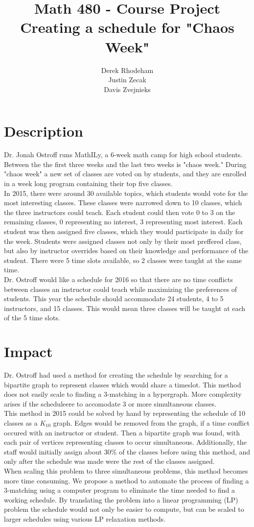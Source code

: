 \documentclass[11pt]{article}
\title{\textbf{Math 480 - Course Project}
			  \\Creating a schedule for "Chaos Week"}
\author{Derek Rhodeham\\
		Justin Zecak\\
		Davis Zvejnieks}
\date{}
\begin{document}
\maketitle

\section{Description}
Dr. Jonah Ostroff runs MathILy, a 6-week math camp for high school students. Between the the first three weeks and the last two weeks is "chaos week." During "chaos week" a new set of classes are voted on by students, and they are enrolled in a week long program containing their top five classes.\\
\indent In 2015, there were around 30 available topics, which students would vote for the most interesting classes. These classes were narrowed down to 10 classes, which the three instructors could teach. Each student could then vote 0 to 3 on the remaining classes, 0 representing no interest, 3 representing most interest. Each student was then assigned five classes, which they would participate in daily for the week. Students were assigned classes not only by their most preffered class, but also by instructor overrides based on their knowledge and performance of the student. There were 5 time slots available, so 2 classes were taught at the same time.\\
\indent Dr. Ostroff would like a schedule for 2016 so that there are no time conflicts between classes an instructor could teach while maximizing the preferences of students. This year the schedule should accommodate 24 students, 4 to 5 instructors, and 15 classes. This would mean three classes will be taught at each of the 5 time slots.


\section{Impact}
Dr. Ostroff had used a method for creating the schedule by searching for a bipartite graph to represent classes which would share a timeslot. This method does not easily scale to finding a 3-matching in a hypergraph. More complexity arises if the scheduleere to accomodate 3 or more simultaneous classes.\\
\indent This method in 2015 could be solved by hand by representing the schedule of 10 classes as a $K_{10}$ graph. Edges would be removed from the graph, if a time conflict occured with an instructor or student. Then a bipartite graph was found, with each pair of vertices representing classes to occur simultaneous. Additionally, the staff would initially assign about 30\% of the classes before using this method, and only after the schedule was made were the rest of the classes assigned.\\
\indent When scaling this problem to three simultaneous problems, this method becomes more time consuming. We propose a method to automate the process of finding a 3-matching using a computer program to eliminate the time needed to find a working schedule. By translating the problem into a linear programming (LP) problem the schedule would not only be easier to compute, but can be scaled to larger schedules using various LP relaxation methods.
\end{document}
